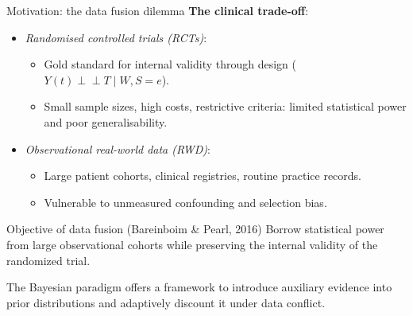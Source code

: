 \documentclass[t]{beamer}
\newcommand{\ci}{\perp\!\!\!\perp}
\begin{document}
\begin{frame}{Motivation: the data fusion dilemma}
    \vspace{0.05cm}
    \textbf{The clinical trade-off}:
    \begin{itemize}
        \setlength{\itemsep}{0.12cm}
        \item \emph{Randomised controlled trials (RCTs)}:
        \begin{itemize}
            \item Gold standard for internal validity through design ($Y(t) \ci T \mid W, S = e$).
            \item Small sample sizes, high costs, restrictive criteria: limited statistical power and poor generalisability.
        \end{itemize}
        \item \emph{Observational real-world data (RWD)}:
        \begin{itemize}
            \item Large patient cohorts, clinical registries, routine practice records.
            \item Vulnerable to unmeasured confounding and selection bias.
        \end{itemize}
    \end{itemize}

    \vspace{0.15cm}
    \begin{alertblock}{Objective of data fusion (Bareinboim \& Pearl, 2016)}
        Borrow statistical power from large observational cohorts while preserving the internal validity of the randomized trial.
    \end{alertblock}

    \vspace{0.1cm}
    The Bayesian paradigm offers a framework to introduce auxiliary evidence into prior distributions and adaptively discount it under data conflict.
\end{frame}
\end{document}
